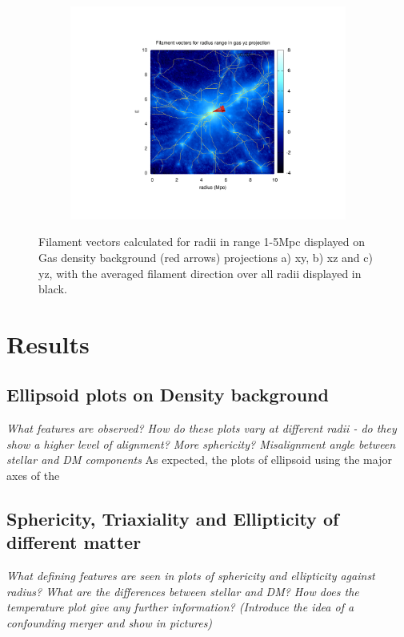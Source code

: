 \documentclass[journal]{IEEEtran}
\begin{document}
\begin{figure}[!t]
\begin{subfigure}[t]{0.3\textwidth}
		\includegraphics[width=\linewidth]{Filyz.pdf}
	\end{subfigure}
\label{fil_calc}
	\caption{Filament vectors calculated for radii in range 1-5Mpc displayed on Gas density background (red arrows) projections a) xy, b) xz and c) yz, with the averaged filament direction over all radii displayed in black.}
\end{figure}

\section{Results}
\subsection{Ellipsoid plots on Density background}
\textit{What features are observed? How do these plots vary at different radii - do they show a higher level of alignment? More sphericity? 
Misalignment angle between stellar and DM components}
As expected, the plots of ellipsoid using the major axes of the 


\subsection{Sphericity, Triaxiality and Ellipticity of different matter}
\textit{What defining features are seen in plots of sphericity and ellipticity against radius? What are the differences between stellar and DM? How does the temperature plot give any further information?
(Introduce the idea of a confounding merger and show in pictures)}
\end{document}
